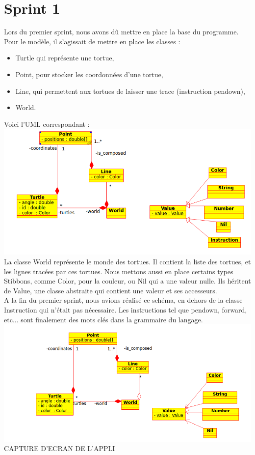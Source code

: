 \section{Sprint 1}
Lors du premier sprint, nous avons dû mettre en place la base du programme.\\ Pour le modèle, il s'agissait de mettre en place les classes :
\begin{itemize}
\item Turtle qui représente une tortue, 
\item Point, pour stocker les coordonnées d'une tortue,
\item Line, qui permettent aux tortues de laisser une trace (instruction pendown),
\item World.\\
\end{itemize}
Voici l'UML correspondant :\\
\includegraphics[scale=0.5]{doc/report/uml/v01.png}
\newpage
La classe World représente le monde des tortues. Il contient la liste des tortues, et les lignes tracées par ces tortues.
Nous mettons aussi en place certains types Stibbons, comme Color, pour la couleur, ou Nil qui a une valeur nulle. Ils héritent de Value, une classe abstraite qui contient une valeur et ses accesseurs.\\

A la fin du premier sprint, nous avions réalisé ce schéma, en dehors de la classe Instruction qui n'était pas nécessaire. Les instructions tel que pendown, forward, etc... sont finalement des mots clés dans la grammaire du langage.\\
\includegraphics[scale=0.5]{doc/report/uml/v01reel.png}
CAPTURE D'ECRAN DE L'APPLI

